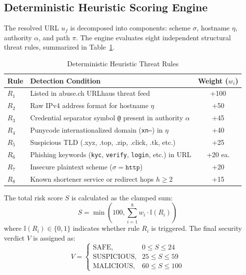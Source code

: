 \documentclass[10pt,conference,letterpaper]{IEEEtran}
\begin{document}
\subsection{Deterministic Heuristic Scoring Engine}
The resolved URL $u_f$ is decomposed into components: scheme $\sigma$, hostname $\eta$, authority $\alpha$, and path $\pi$. The engine evaluates eight independent structural threat rules, summarized in Table~\ref{tab:rules}.

\begin{table}[h]
\centering
\caption{Deterministic Heuristic Threat Rules}
\label{tab:rules}
\begin{tabularx}{\linewidth}{l X c}
\toprule
\textbf{Rule} & \textbf{Detection Condition} & \textbf{Weight ($w_i$)} \\
\midrule
$R_1$ & Listed in abuse.ch URLhaus threat feed & +100 \\
$R_2$ & Raw IPv4 address format for hostname $\eta$ & +50 \\
$R_3$ & Credential separator symbol \texttt{@} present in authority $\alpha$ & +45 \\
$R_4$ & Punycode internationalized domain (\texttt{xn--}) in $\eta$ & +40 \\
$R_5$ & Suspicious TLD (.xyz, .top, .zip, .click, .tk, etc.) & +25 \\
$R_6$ & Phishing keywords (\texttt{kyc}, \texttt{verify}, \texttt{login}, etc.) in URL & +20 ea. \\
$R_7$ & Insecure plaintext scheme ($\sigma = \texttt{http}$) & +20 \\
$R_8$ & Known shortener service or redirect hops $h \ge 2$ & +15 \\
\bottomrule
\end{tabularx}
\end{table}

The total risk score $S$ is calculated as the clamped sum:
\begin{equation}
    S = \min\left(100, \sum_{i=1}^{8} w_i \cdot \mathbb{I}(R_i)\right)
\end{equation}
where $\mathbb{I}(R_i) \in \{0, 1\}$ indicates whether rule $R_i$ is triggered. The final security verdict $V$ is assigned as:
\begin{equation}
    V = \begin{cases}
        \text{SAFE}, & 0 \le S \le 24 \\
        \text{SUSPICIOUS}, & 25 \le S \le 59 \\
        \text{MALICIOUS}, & 60 \le S \le 100
    \end{cases}
\end{equation}
\end{document}
